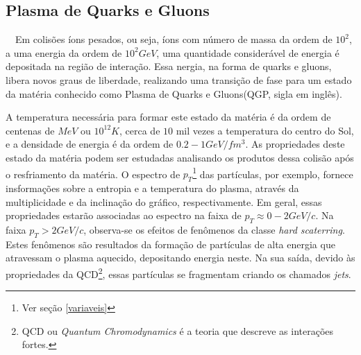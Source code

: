 \subsection{Plasma de Quarks e Gluons}

\ \ Em colisões íons pesados, ou seja, íons com número de massa da ordem de $10^2$, a uma energia da ordem de $10^2 GeV$,
uma quantidade considerável de energia é depositada na região de interação. Essa nergia, na forma de quarks e gluons,
libera novos graus de liberdade, realizando uma transição de fase para um estado da matéria conhecido como Plasma de Quarks e Gluons(QGP,
sigla em inglês).
\par
A temperatura necessária para formar este estado da matéria é da ordem de centenas de $MeV$ ou
$10^{12} K$, cerca de $10$ mil vezes a temperatura do centro do Sol, e a densidade de energia é da ordem de $0.2-1
GeV/fm^{3}$. As propriedades deste estado da matéria podem ser estudadas analisando os produtos dessa colisão após o resfriamento
da matéria. O espectro de $p_T$\footnote{Ver seção \ref{variaveis}} das partículas, por exemplo, fornece insformações sobre a entropia
e a temperatura do plasma, através da multiplicidade e da inclinação do gráfico, respectivamente. Em geral, essas propriedades estarão
associadas ao espectro na faixa de $p_T \approx 0-2 GeV/c$. Na faixa $p_T > 2 GeV/c$, observa-se os efeitos de fenômenos
da classe {\it hard scaterring}. Estes fenômenos são resultados da formação de partículas de alta energia que atravessam o plasma
aquecido, depositando energia neste. Na sua saída, devido às propriedades da QCD\footnote{QCD ou {\it Quantum Chromodynamics} é a 
teoria que descreve as interações fortes.}, essas partículas se fragmentam criando os chamados {\it jets}.



